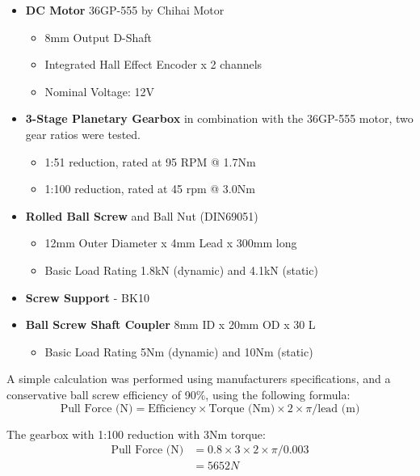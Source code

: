 \begin{itemize}[nosep]
    \item \textbf{DC Motor} 36GP-555 by Chihai Motor
    \begin{itemize}
        \item 8mm Output D-Shaft 
        \item Integrated Hall Effect Encoder x 2 channels
        \item Nominal Voltage: 12V
    \end{itemize}
    \item \textbf{3-Stage Planetary Gearbox} in combination with the 36GP-555 motor, two gear ratios were tested.
    \begin{itemize}
        \item 1:51 reduction, rated at 95 RPM @ 1.7Nm
        \item 1:100 reduction, rated at 45 rpm @ 3.0Nm
    \end{itemize} 
    \item \textbf{Rolled Ball Screw} and Ball Nut (DIN69051)
    \begin{itemize}
        \item 12mm Outer Diameter x 4mm Lead x 300mm long
        \item Basic Load Rating 1.8kN (dynamic) and 4.1kN (static)
    \end{itemize}
    \item \textbf{Screw Support} - BK10
    \item \textbf{Ball Screw Shaft Coupler} 8mm ID x 20mm OD x 30 L
    \begin{itemize}
        \item Basic Load Rating 5Nm (dynamic) and 10Nm (static)
    \end{itemize}
\end{itemize}

A simple calculation was performed using manufacturers specifications, and a conservative ball screw efficiency of 90\%, using the following formula:
\begin{equation*}
    \textrm{Pull Force (N)} = \textrm{Efficiency} \times \textrm{Torque (Nm)} \times 2 \times \pi / \textrm{lead (m)}
\end{equation*}

The gearbox with 1:100 reduction with 3Nm torque:
\begin{align*}
    \textrm{Pull Force (N)} &= 0.8 \times 3 \times 2 \times \pi / 0.003\\
                            &= 5652N
\end{align*}

